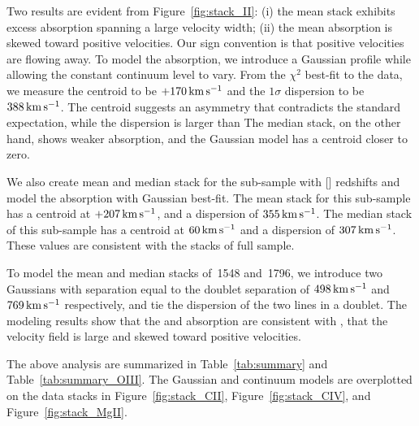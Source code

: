 \documentclass[iop]{emulateapj}
\begin{document}

Two results are evident from Figure~\ref{fig:stack_II}: (i) the mean stack exhibits excess 
absorption spanning a large velocity width; (ii) the mean absorption is skewed toward positive 
velocities. Our sign convention is that positive velocities are flowing away. To model the 
absorption, we introduce a Gaussian profile while allowing the constant continuum level to vary. 
From the $\chi^2$ best-fit to the data, we measure the centroid to be $+170\,{\rm km\,s^{-1}}$ and 
the $1\sigma$ dispersion to be $388\,{\rm km\,s^{-1}}$. The centroid suggests an asymmetry that 
contradicts the standard expectation, while the dispersion is larger than  The median stack, on 
the other hand, shows weaker absorption, and the Gaussian model has a centroid closer to zero. 

We also create mean and median 
stack for the sub-sample with [] redshifts and model the absorption with Gaussian 
best-fit. The mean stack for this sub-sample has a centroid at $+207\,{\rm km\,s^{-1}}$, and a 
dispersion of $355\,{\rm km\,s^{-1}}$. The median stack of this sub-sample has a centroid at 
$60\,{\rm km\,s^{-1}}$ and a dispersion of $307\,{\rm km\,s^{-1}}$. These values are consistent 
with the stacks of full sample. 

To model the mean and median stacks of \,1548 and \,1796, we introduce two 
Gaussians with separation equal to the doublet separation of $498\,{\rm km\,s^{-1}}$ and 
$769\,{\rm km\,s^{-1}}$ respectively, and tie the dispersion of the two lines in a doublet. The 
modeling results show that the  and  absorption are consistent with 
, that the velocity field is large and skewed toward positive velocities. 

The above analysis are summarized in Table~\ref{tab:summary} and 
Table~\ref{tab:summary_OIII}. The Gaussian and continuum models are overplotted on the data stacks 
in Figure~\ref{fig:stack_CII}, Figure~\ref{fig:stack_CIV}, and Figure~\ref{fig:stack_MgII}. 
\end{document}
